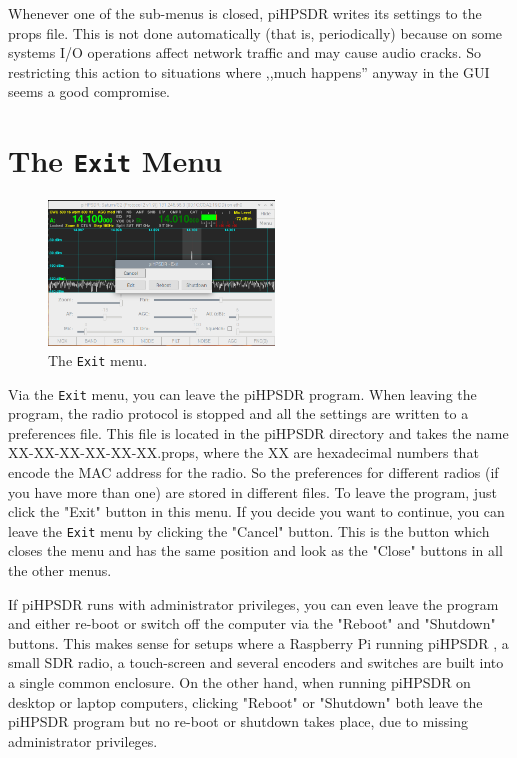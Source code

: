 \documentclass[12pt]{book}
\def\bltt#1{\texttt{\color{blue}#1}}
\def\pH{pi\-HPSDR }
\begin{document}
Whenever one of the sub-menus is closed, piHPSDR writes its settings to the props file. This is not done
automatically (that is, periodically) because on some systems I/O operations affect
network traffic and may cause audio cracks. So restricting this action to situations
where ,,much happens'' anyway in the GUI seems a good compromise.
\section{The \texttt{Exit} Menu}

\begin{figure}[ht]
\center
\includegraphics[width=6cm]{ExitMenu.png}
\caption{The \bltt{Exit} menu.}
\end{figure}

Via the \bltt{Exit} menu, you can leave the \pH program. When leaving the program,
the radio protocol is stopped and all the settings are written to a preferences file. This
file is located in the \pH directory and takes the name XX-XX-XX-XX-XX-XX.props, where
the XX are hexadecimal numbers that encode the MAC address for the radio.
So the preferences for different radios (if you
have more than one) are stored in different files. To leave the program, just click the
"Exit" button in this menu. If you decide you want to continue, you can leave the \bltt{Exit}
menu by clicking the "Cancel" button. This is the button which closes the menu and has
the same position and look as the "Close" buttons in all the other menus.

If \pH runs with administrator privileges, you can even leave the program and either re-boot
or switch off the computer via the "Reboot" and "Shutdown" buttons. This makes sense for setups
where a Raspberry Pi running \pH, a small SDR radio, a touch-screen and several encoders
and switches are built into a single common enclosure. On the other hand, when running
\pH on desktop or laptop computers, clicking "Reboot" or "Shutdown" both leave the \pH
program but no re-boot or shutdown takes place, due to missing administrator privileges.
\end{document}
